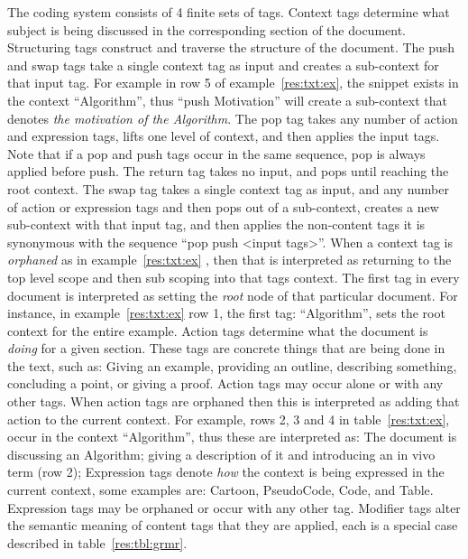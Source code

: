 \documentclass[sigconf]{acmart}
\begin{document}
The coding system consists of 4 finite sets of tags. Context tags determine what
subject is being discussed in the corresponding section of the document.
%
Structuring tags construct and traverse the structure of the document. The
push and swap tags take a single context tag as input and creates a sub-context
for that input tag. For example in row 5 of example~\ref{res:txt:ex}, the
snippet exists in the context ``Algorithm'', thus ``push Motivation'' will
create a sub-context that denotes \emph{the motivation of the Algorithm}.
%
The pop tag takes any number of action and expression tags, lifts one level of
context, and then applies the input tags. Note that if a pop and push tags occur
in the same sequence, pop is always applied before push. The return tag takes no
input, and pops until reaching the root context. The swap tag takes a single
context tag as input, and any number of action or expression tags and then pops
out of a sub-context, creates a new sub-context with that input tag, and
then applies the non-content tags it is synonymous with the sequence ``pop push
<input tags>''.
%
When a context tag is \emph{orphaned} as in example~\ref{res:txt:ex}
, then that is interpreted as returning to the
top level scope and then sub scoping into that tags context. The first tag in
every document is interpreted as setting the \emph{root} node of that particular
document. For instance, in example~\ref{res:txt:ex} row 1, the first tag:
``Algorithm'', sets the root context for the entire example.
%
Action tags determine what the document is \emph{doing} for a given section.
These tags are concrete things that are being done in the text, such as: Giving
an example, providing an outline, describing something, concluding a point, or
giving a proof. Action tags may occur alone or with any other tags. When action
tags are orphaned then this is interpreted as adding that action to the current
context. For example, rows 2, 3 and 4 in table~\ref{res:txt:ex}, occur in the
context ``Algorithm'', thus these are interpreted as: The document is discussing
an Algorithm; giving a description of it and introducing an in vivo term (row
2); 
%
Expression tags denote \emph{how} the context is being expressed in the current
context, some examples are: Cartoon, PseudoCode, Code, and Table. Expression
tags may be orphaned or occur with any other tag. Modifier tags alter the
semantic meaning of content tags that they are applied, each is a special case
described in table~\ref{res:tbl:grmr}.
%
\end{document}
